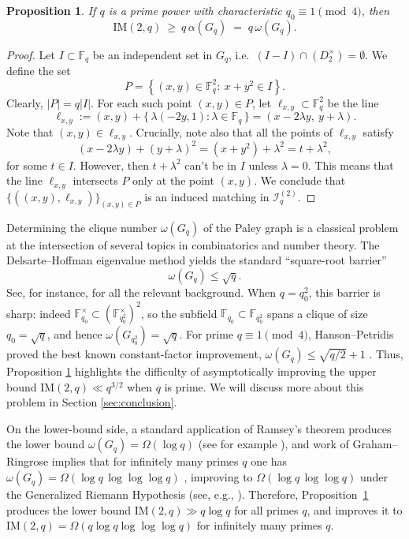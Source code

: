 \documentclass[12pt,reqno]{amsart}
\theoremstyle{plain}
\newtheorem{proposition}[theorem]{Proposition}
\theoremstyle{definition}
\newcommand{\F}{\mathbb{F}}
\newcommand{\IM}{\mathrm{IM}}
\newcommand{\II}{\mathcal{I}}
\newcommand{\1}{\mathbf{1}}
\begin{document}
\begin{proposition}\label{prop:paley-to-im}
If $q$ is a prime power with characteristic $q_0\equiv 1\pmod 4$, then
\[
  \IM(2,q)\ \ge\ q\,\alpha(G_q)\;=\;q\,\omega(G_q).
\]
\end{proposition}
\begin{proof}
Let $I\subset\F_q$ be an independent set in $G_q$, i.e.\ $(I-I)\cap (D_2^\times)=\emptyset$. We define the set
$$P=\left\{(x,y) \in \mathbb{F}_{q}^{2}:\ x+y^2 \in I\right\}.$$
Clearly, $|P|=q|I|$. For each such point $(x,y) \in P$, let $\ell_{x,y} \subset \mathbb{F}_{q}^{2}$ be the line
\[
  \ell_{x,y}:=(x,y)+\{\,\lambda(-2y,1):\lambda\in\F_q\,\} = (x-2\lambda y,\ y+\lambda).
\]
Note that $(x,y) \in \ell_{x,y}$. Crucially, note also that all the points of $\ell_{x,y}$ satisfy
\[
  (x-2\lambda y)+(y+\lambda)^2 = (x+y^2)+\lambda^2=t+\lambda^2,
\]
for some $t \in I$. However, then $t + \lambda^2$ can't be in $I$ unless $\lambda =0$. This means that the line $\ell_{x,y}$ intersects $P$ only at the point $(x,y)$. We conclude that $\{((x,y),\ell_{x,y})\}_{(x,y)\in P}$ is an induced matching in $\II_q^{(2)}$.
\end{proof}
Determining the clique number $\omega(G_q)$ of the Paley graph is a classical problem at the intersection of several topics in combinatorics and number theory. The Delsarte--Hoffman eigenvalue method yields the standard ``square-root barrier''
\[
\omega(G_q)\le \sqrt q.
\]
See, for instance, \cite{Yip2021} for all the relevant background. 
When $q=q_0^2$, this barrier is sharp: indeed $\mathbb F_{q_0}^\times\subset (\mathbb F_{q_{0}^2}^\times)^2$, so the subfield $\mathbb F_{q_0}\subset \mathbb F_{q_{0}^2}$ spans a clique of size $q_{0}=\sqrt q$, and hence $\omega(G_{q_{0}^2})=\sqrt q$.
For prime $q\equiv 1\pmod 4$, Hanson--Petridis proved the best known constant-factor improvement,
$\omega(G_q)\le \sqrt{q/2}+1$ \cite{HansonPetridis2021}. Thus, Proposition \ref{prop:paley-to-im} highlights the difficulty of asymptotically improving the upper bound $\IM(2, q) \ll q^{3/2}$ when $q$ is prime. We will discuss more about this problem in Section \ref{sec:conclusion}. 

On the lower-bound side, a standard application of Ramsey's theorem produces the lower bound $\omega(G_q)=\Omega(\log q)$ (see for example \cite{Cohen1988PaleyClique}), and
work of Graham--Ringrose implies that for infinitely many primes $q$ one has
$\omega(G_q)=\Omega(\log q\,\log\log\log q)$ \cite{GrahamRingrose1990LeastNonres}, improving to
$\Omega(\log q\,\log\log q)$ under the Generalized Riemann Hypothesis (see, e.g., \cite{Montgomery1971TopicsMultNT}).
Therefore, Proposition~\ref{prop:paley-to-im} produces the lower bound $\IM(2, q) \gg q \log q$ for all primes $q$, and improves it to $\IM(2, q) = \Omega(q \log q \log\log \log q)$ for infinitely many primes $q$.
\end{document}
